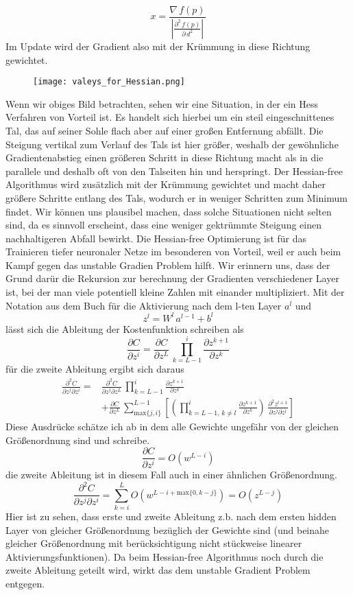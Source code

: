 \documentclass[12pt]{article}
\newcommand{\partderv}[2]{\frac{\partial{#1}}{\partial{#2}}}
\newcommand{\twoderv}[3]{\frac{\partial^2#1}{\partial{#2}\partial{#3}}}
\begin{document}
$$x=\frac{\nabla\,f(p)}{|\frac{\partial^2\,f(p)}{\partial\,d^2}|}$$
Im Update wird der Gradient also mit der Krümmung in diese Richtung gewichtet.
\begin{figure}[H]\centering\texttt{[image: valeys\_for\_Hessian.png]}\caption{}\end{figure}
Wenn wir obiges Bild betrachten, sehen wir eine Situation, in der ein Hess Verfahren von Vorteil ist. Es handelt sich hierbei um ein steil eingeschnittenes Tal, das auf seiner Sohle flach aber auf einer großen Entfernung abfällt. Die Steigung vertikal zum Verlauf des Tals ist hier größer, weshalb der gewöhnliche Gradientenabstieg einen größeren Schritt in diese Richtung macht als in die parallele und deshalb oft von den Talseiten hin und herspringt. Der Hessian-free Algorithmus wird zusätzlich mit der Krümmung gewichtet und macht daher größere Schritte entlang des Tals, wodurch er in weniger Schritten zum Minimum findet. Wir können uns plausibel machen, dass solche Situationen nicht selten sind, da es sinnvoll erscheint, dass eine weniger gektrümmte Steigung einen nachhaltigeren Abfall bewirkt. Die Hessian-free Optimierung ist für das Trainieren tiefer neuronaler Netze im besonderen von Vorteil, weil er auch beim Kampf gegen das unstable Gradien Problem hilft. Wir erinnern uns, dass der Grund darür die Rekursion zur berechnung der Gradienten verschiedener Layer ist, bei der man viele potentiell kleine Zahlen mit einander multipliziert.\newline
Mit der Notation aus dem Buch für die Aktivierung nach dem l-ten Layer $a^l$ und 
$$z^l=W^l\,a^{l-1}+b^l$$
lässt sich die Ableitung der Kostenfunktion schreiben als
$$\frac{\partial{C}}{\partial{z^i}}=\partderv{C}{z^L}\,\prod_{k=L-1}^{i}\partderv{z^{k+1}}{z^k}$$
für die zweite Ableitung ergibt sich daraus
\begin{align*}\twoderv{C}{z^j}{z^i}=&\twoderv{C}{z^j}{z^L}\,\prod_{k=L-1}^{i}\partderv{z^{k+1}}{z^k}\\
&+\partderv{C}{z^L}\,\sum_{\text{max}\{j,i\}}^{L-1}\left[\left(\prod_{k=L-1,\,k\neq{l}}^i\partderv{z^{k+1}}{z^k}\right)\,\twoderv{z^{l+1}}{z^j}{z^l}\right]\end{align*}
Diese Ausdrücke schätze ich ab in dem alle Gewichte ungefähr von der gleichen Größenordnung sind und schreibe.
$$\partderv{C}{z^i}=O(w^{L-i})$$
die zweite Ableitung ist in diesem Fall auch in einer ähnlichen Größenordnung.
$$\twoderv{C}{z^j}{z^i}=\sum_{k=i}^LO(w^{L-i+\text{max}\{0,k-j\}})=O(z^{L-j})$$
Hier ist zu sehen, dass erste und zweite Ableitung z.b. nach dem ersten hidden Layer von gleicher Größenordnung bezüglich der Gewichte sind (und beinahe gleicher Größenordnung mit berücksichtigung nicht stückweise linearer Aktivierungsfunktionen). Da beim Hessian-free Algorithmus noch durch die zweite Ableitung geteilt wird, wirkt das dem unstable Gradient Problem entgegen.\newline\newline
\end{document}
